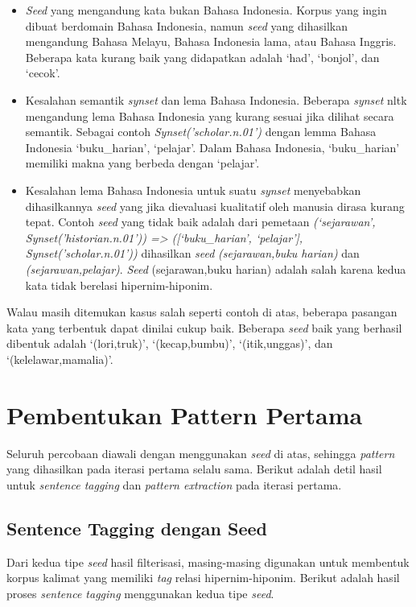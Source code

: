 \begin{itemize}
  \item \textit{Seed} yang mengandung kata bukan Bahasa Indonesia. Korpus yang ingin dibuat berdomain Bahasa Indonesia, namun \textit{seed} yang dihasilkan mengandung Bahasa Melayu, Bahasa Indonesia lama, atau Bahasa Inggris. Beberapa kata kurang baik yang didapatkan adalah `had', `bonjol', dan `cecok'.
  \item Kesalahan semantik \textit{synset} dan lema Bahasa Indonesia. Beberapa \textit{synset} nltk mengandung lema Bahasa Indonesia yang kurang sesuai jika dilihat secara semantik. Sebagai contoh \textit{Synset('scholar.n.01')} dengan lemma Bahasa Indonesia `buku\_harian', `pelajar'. Dalam Bahasa Indonesia, `buku\_harian' memiliki makna yang berbeda dengan `pelajar'.
  \item Kesalahan lema Bahasa Indonesia untuk suatu \textit{synset} menyebabkan dihasilkannya \textit{seed} yang jika dievaluasi kualitatif oleh manusia dirasa kurang tepat. Contoh \textit{seed} yang tidak baik adalah dari pemetaan \textit{(`sejarawan', Synset('historian.n.01')) => ([`buku\_harian', `pelajar'], Synset('scholar.n.01'))} dihasilkan \textit{seed} \textit{(sejarawan,buku harian)} dan \textit{(sejarawan,pelajar)}. \textit{Seed} (sejarawan,buku harian) adalah salah karena kedua kata tidak berelasi hipernim-hiponim. 
\end{itemize}

Walau masih ditemukan kasus salah seperti contoh di atas, beberapa pasangan kata yang terbentuk dapat dinilai cukup baik. Beberapa \textit{seed} baik yang berhasil dibentuk adalah `(lori,truk)', `(kecap,bumbu)', `(itik,unggas)', dan `(kelelawar,mamalia)'.

\section{Pembentukan Pattern Pertama}
Seluruh percobaan diawali dengan menggunakan \textit{seed} di atas, sehingga \textit{pattern} yang dihasilkan pada iterasi pertama selalu sama. Berikut adalah detil hasil untuk \textit{sentence tagging} dan \textit{pattern extraction} pada iterasi pertama.

\subsection{Sentence Tagging dengan Seed}
Dari kedua tipe \textit{seed} hasil filterisasi, masing-masing digunakan untuk membentuk korpus kalimat yang memiliki \textit{tag} relasi hipernim-hiponim. Berikut adalah hasil proses \textit{sentence tagging} menggunakan kedua tipe \textit{seed}.

